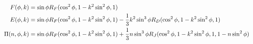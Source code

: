 \documentclass[12pt]{article}
\begin{document}
\begin{align}
F(\phi, k) &= \sin\phi R_F(\cos^2\phi, 1-k^2\sin^2\phi, 1) \notag \\
E(\phi, k) &= \sin\phi R_F(\cos^2\phi, 1-k^2\sin^2\phi, 1) -
    \frac{1}{3}k^2\sin^3\phi R_D(\cos^2\phi, 1-k^2\sin^2\phi, 1) \notag \\
\Pi(n, \phi, k) &= \sin\phi R_F(\cos^2\phi, 1-k^2\sin^2\phi, 1) +
    \frac{1}{3}n\sin^3\phi R_J(\cos^2\phi, 1-k^2\sin^2\phi, 1, 1-n\sin^2\phi) \notag
\end{align}
\end{document}
